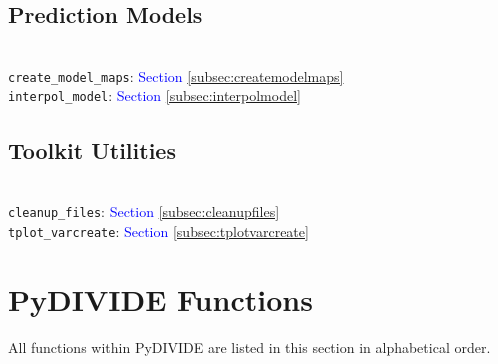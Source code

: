 \documentclass{article}
\begin{document}
\subsection{Prediction Models}
\vspace{-10mm}
\noindent\\
\indent \texttt{create\_model\_maps}: \textcolor{blue}{Section \ref{subsec:createmodelmaps}}\\
\indent \texttt{interpol\_model}: \textcolor{blue}{Section \ref{subsec:interpolmodel}}\\
\vspace{-10mm}
\subsection{Toolkit Utilities}
\vspace{-10mm}
\noindent\\
\indent \texttt{cleanup\_files}: \textcolor{blue}{Section \ref{subsec:cleanupfiles}}\\
\indent \texttt{tplot\_varcreate}: \textcolor{blue}{Section \ref{subsec:tplotvarcreate}}\\

\newpage
\section{PyDIVIDE Functions}
All functions within PyDIVIDE are listed in this section in alphabetical order.
\end{document}
